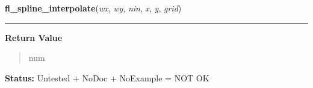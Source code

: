     \label{xformslib:library:fl_spline_interpolate}

    \vspace{0.5ex}

\hspace{.8\funcindent}\begin{boxedminipage}{\funcwidth}

    \raggedright \textbf{fl\_spline\_interpolate}(\textit{wx}, \textit{wy}, \textit{nin}, \textit{x}, \textit{y}, \textit{grid})

    \vspace{-1.5ex}

    \rule{\textwidth}{0.5\fboxrule}
\setlength{\parskip}{2ex}
\setlength{\parskip}{1ex}
      \textbf{Return Value}
    \vspace{-1ex}

      \begin{quote}
      num

      \end{quote}

\textbf{Status:} Untested + NoDoc + NoExample = NOT OK



    \end{boxedminipage}

    \label{xformslib:library:fl_set_xyplot_symbol}

    \vspace{0.5ex}

